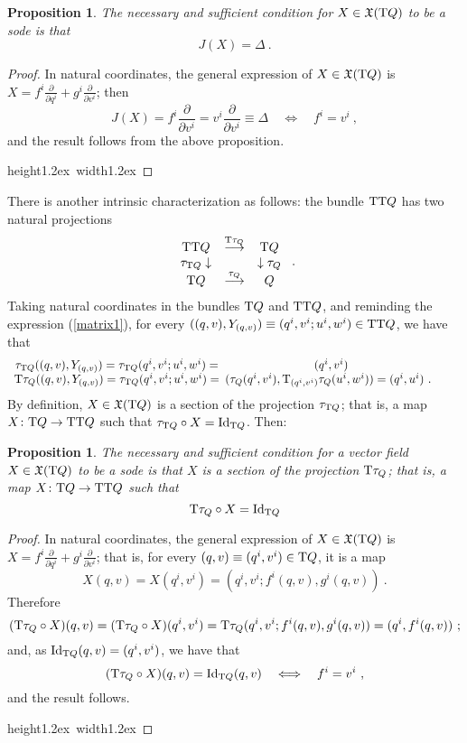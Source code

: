 \documentclass[12pt]{report}
\newtheorem{prop}[teor]{Proposition}
\def\dst{\displaystyle}
\def\derpar#1#2{\frac{\partial{#1}}{\partial{#2}}}
\def\mapping#1{\mathrel{\mathop{\longrightarrow}\limits^{#1}}}
\def\qed{\ifvmode\removelastskip\fi
{\unskip\nobreak\hfil\penalty50\hbox{}\nobreak\hfil
\hbox{\vrule height1.2ex width1.2ex}\parfillskip=0pt
\finalhyphendemerits=0 \par\smallskip}}
\def\vf{\mathfrak X}
\def\Tan{{\rm T}}
\begin{document}
\begin{prop}
The necessary and sufficient condition for $X\in\vf(\Tan Q)$ to be a {\sc sode} is that 
$$
J(X)=\Delta \ .
$$
\end{prop}
\begin{proof}
In natural coordinates, the general expression of $X\in\vf(\Tan Q)$ is
\(\dst X=f^i\derpar{}{q^i}+g^i\derpar{}{v^i}\); then
$$
J(X)=f^i\derpar{}{v^i}=v^i\derpar{}{v^i}\equiv\Delta
\quad \Longleftrightarrow \quad f^i=v^i \ ,
$$
and the result follows from the above proposition.
\\ \qed  \end{proof}

There is another intrinsic characterization as follows:
the bundle $\Tan \Tan Q$ has two natural projections
$$
\begin{array}{ccc}
\Tan\Tan Q&\mapping{\Tan\tau_Q}&\Tan Q
\\
\tau_{\Tan Q}\downarrow& &\downarrow\tau_Q
\\
\Tan Q&\mapping{\tau_Q}&Q 
\end{array} \ .
$$
Taking natural coordinates in the bundles $\Tan Q$ and
$\Tan\Tan Q$, and reminding the expression (\ref{matrix1}),
for every $((q,v),Y_{(q,v)})\equiv (q^i,v^i;u^i,w^i)\in\Tan\Tan Q$,
we have that
$$
\begin{array}{ccccccc}
\tau_{\Tan Q}((q,v),Y_{(q,v)})=\tau_{\Tan Q}(q^i,v^i;u^i,w^i)=&(q^i,v^i)& & \\
\Tan\tau_Q((q,v),Y_{(q,v)})=\tau_{\Tan Q}(q^i,v^i;u^i,w^i)=&
\!\!\!(\tau_Q(q^i,v^i),\Tan_{(q^i,v^i)}\tau_Q(u^i,w^i))=(q^i,u^i) \ .
\end{array}
$$
By definition, $X\in\vf(\Tan Q)$ is a section of the projection
$\tau_{\Tan Q}$; that is, a map $X\colon\Tan Q\to\Tan\Tan Q$ 
such that $\tau_{\Tan Q}\circ X={\rm Id}_{\Tan Q}$. Then:

\begin{prop}
The necessary and sufficient condition for a vector field
$X\in\vf(\Tan Q)$ to be a {\sc sode} is that $X$ is a section
of the projection $\Tan\tau_Q$; that is,  a map
$X\colon\Tan Q\to\Tan\Tan Q$ such that
$$
\Tan\tau_Q\circ X ={\rm Id}_{\Tan Q}
$$
\end{prop}
\begin{proof}
In natural coordinates, the general expression of
$X\in\vf(\Tan Q)$ is
\(\dst X=f^i\derpar{}{q^i}+g^i\derpar{}{v^i}\);
that is, for every
$(q,v)\equiv (q^i,v^i)\in\Tan Q$, it is a map
$$
X(q,v)=X(q^i,v^i)=(q^i,v^i;f^i(q,v),g^i(q,v)) \ .
$$
Therefore
$$
(\Tan\tau_Q\circ X)(q,v)=(\Tan\tau_Q\circ X)(q^i,v^i)=
\Tan\tau_Q(q^i,v^i;f^i(q,v),g^i(q,v))=(q^i,f^i(q,v)) \ ;
$$
and, as ${\rm Id}_{\Tan Q}(q,v)=(q^i,v^i)$, we have that
$$
(\Tan\tau_Q\circ X)(q,v)={\rm Id}_{\Tan Q}(q,v)\quad
\Longleftrightarrow \quad f^i=v^i \ ,
$$
and the result follows.
\\ \qed  \end{proof}
\end{document}
